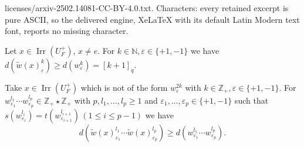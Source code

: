 \documentclass[10pt,a4paper]{amsart}
\DeclareMathOperator{\Irr}{Irr}
\newcommand{\NN}{\mathbb{N}}
\newcommand{\ZZ}{\mathbb{Z}}
\newcommand{\eps}{\varepsilon}
\begin{document}
licenses/arxiv-2502.14081-CC-BY-4.0.txt. Characters: every retained excerpt is pure ASCII, so the delivered engine, XeLaTeX with its default Latin Modern text font, reports no missing character.
\begin{lemma}\label{lemma11}
Let $x\in \Irr(U_F^+)$, $x \neq e$. %
For $k\in\NN,\eps\in \{+1,-1\}$ we have $d(\widetilde{w}(x)^k_\eps) \ge d(w^k_\eps)=[k+1]_q$.
\end{lemma}

\begin{lemma}\label{lemma12}
Take $x\in \Irr(U_F^+)$ which is not of the form $w^{2k}_{\eps}$ with $k\in\ZZ_+,\eps\in\{+1,-1\}$. For $w^{l_1}_{\eps_1}\cdots w^{l_p}_{\eps_p}\in \ZZ_+\star \ZZ_+$ with $p, l_1,\dotsc,l_p\ge 1$ and $\eps_1,\dotsc,\eps_p\in\{+1,-1\}$ such that $s(w^{l_i}_{\eps_i})=t(w^{l_{i+1}}_{\eps_{i+1}})\,(1\le i \le p-1)$ we have
\[
d(\widetilde{w}(x)^{l_1}_{\eps_1}\cdots 
\widetilde{w}(x)^{l_p}_{\eps_p} ) \ge 
d(w^{l_1}_{\eps_1}\cdots 
w^{l_p}_{\eps_p} ).
\]
\end{lemma}
\end{document}

